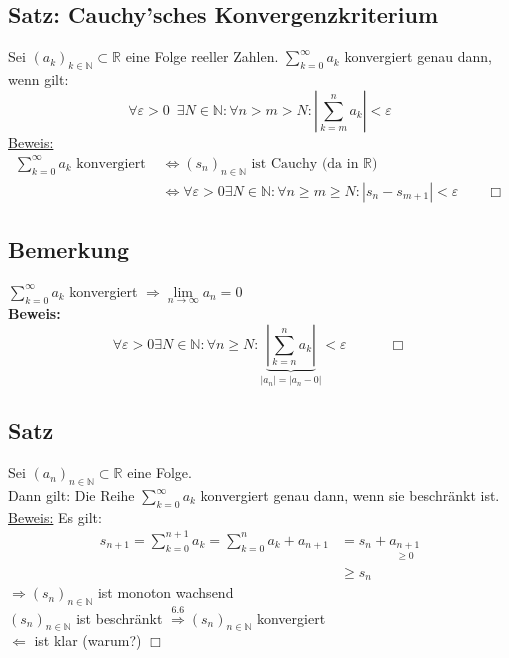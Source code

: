 \subsection{Satz: Cauchy'sches Konvergenzkriterium} %
\label{sub:satz}
Sei $(a_k)_{k \in \mathds{N}} \subset \mathds{R}$ eine Folge reeller Zahlen. $\sum\limits_{k=0}^{\infty} a_k$ konvergiert genau dann, wenn gilt:
\[
	\forall \varepsilon >0 \enspace \exists N \in \mathds{N} : \forall n >m >N : \left|\sum\limits_{k=m}^{n} a_k\right| < \varepsilon
\]
\underline{Beweis:} 
\begin{align*}
	\sum\limits_{k=0}^{\infty} a_k \text{ konvergiert } &\Leftrightarrow (s_n)_{n \in \mathds{N}} \text{ ist Cauchy (da in $\mathds{R}$)} \\
	&\Leftrightarrow \forall \varepsilon > 0 \exists N \in \mathds{N} : \forall n \geq m \geq N : \left|s_n -s_{m+1}\right| < \varepsilon \qquad \Box
\end{align*}

\subsection{Bemerkung} %
\label{sub:bemerkung}
$\sum\limits_{k=0}^{\infty}  a_k$ konvergiert $\Longrightarrow \lim\limits_{n \to \infty} a_n = 0$
\vspace{\baselineskip} \\
\textbf{Beweis:}
\[
	\forall \varepsilon > 0 \exists N  \in \mathds{N} : \forall n \geq N 
	: \underbrace{\left|\sum\limits_{k=n}^{n} a_k \right|}_{|a_n| = |a_n -0|} < \varepsilon \qquad \quad \Box
\]

\subsection{Satz} %
\label{sub:satz}
Sei $(a_n)_{n \in \mathds{N}} \subset \mathds{R}$ eine Folge. \\
Dann gilt: Die Reihe $\sum\limits_{k=0}^{\infty} a_k$ konvergiert genau dann, wenn sie beschränkt ist.
\vspace{\baselineskip} \\
\underline{Beweis:} Es gilt:
\begin{align*}
	s_{n+1} = \sum\limits_{k=0}^{n+1} a_k = \sum\limits_{k=0}^{n}  a_k + a_{n+1} &= s_n + \underset{\geq 0}{a_{n+1}} \\
	&\geq s_n
\end{align*}
$\Longrightarrow (s_n)_{n \in \mathds{N}}$ ist monoton wachsend \\
$(s_n)_{n \in \mathds{N}}$ ist beschränkt $\overset{6.6}{\Rightarrow} (s_n)_{n \in \mathds{N}}$ konvergiert
\vspace{\baselineskip} \\
$\Leftarrow$ ist klar (warum?) \quad \quad \quad \quad $\Box$

